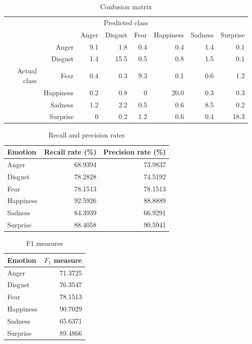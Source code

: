\documentclass[12pt]{article}
\begin{document}
\begin{table}
\centering
\begin{tabular}{r r | r r r r r r}
\multicolumn{8}{c}{Predicted class} \\
&  & Anger & Disgust & Fear & Happiness & Sadness & Surprise \\
\hline
 & Anger            & 9.1 & 1.8  & 0.4 & 0.4  & 1.4 & 0.1  \\
 & Disgust          & 1.4 & 15.5 & 0.5 & 0.8  & 1.5 & 0.1  \\
Actual class & Fear & 0.4 & 0.3  & 9.3 & 0.1  & 0.6 & 1.2  \\
 & Happiness        & 0.2 & 0.8  & 0   & 20.0 & 0.3 & 0.3  \\
 & Sadness          & 1.2 & 2.2  & 0.5 & 0.6  & 8.5 & 0.2  \\
 & Surprise         & 0   & 0.2  & 1.2 & 0.6  & 0.4 & 18.3 \\
\end{tabular}
\caption{Confusion matrix}
\end{table}

\begin{table}
\centering
\begin{tabular}{l | r r}
Emotion & Recall rate (\%) & Precision rate (\%) \\
\hline
Anger     & 68.9394 & 73.9837 \\
Disgust   & 78.2828 & 74.5192 \\
Fear      & 78.1513 & 78.1513 \\
Happiness & 92.5926 & 88.8889 \\
Sadness   & 64.3939 & 66.9291 \\
Surprise  & 88.4058 & 90.5941 \\
\end{tabular}
\caption{Recall and precision rates}
\end{table}

\begin{table}
\centering
\begin{tabular}{l | r}
Emotion & \( F_1 \) measure \\
\hline
Anger     & 71.3725 \\
Disgust   & 76.3547 \\
Fear      & 78.1513 \\
Happiness & 90.7029 \\
Sadness   & 65.6371 \\
Surprise  & 89.4866 \\
\end{tabular}
\caption{F1 measures}
\end{table}
\end{document}
